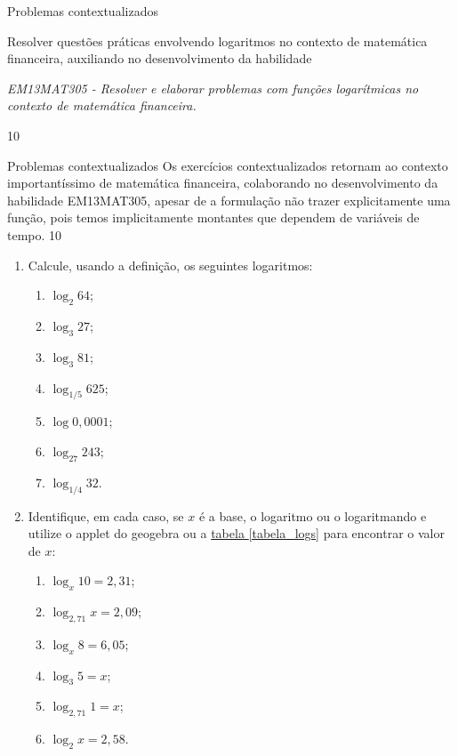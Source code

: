 \clearmargin
\begin{objectives}{Problemas contextualizados}
{
	Resolver questões práticas envolvendo logaritmos no contexto de matemática financeira, auxiliando no desenvolvimento da habilidade

	\textit{EM13MAT305 - Resolver e elaborar problemas com funções logarítmicas no contexto de matemática financeira.}
}{1}{0}
\end{objectives}
\begin{sugestions}{Problemas contextualizados}
{
	Os exercícios contextualizados retornam ao contexto importantíssimo de matemática financeira, colaborando no desenvolvimento da habilidade EM13MAT305, apesar de a formulação não trazer explicitamente uma função, pois temos implicitamente montantes que dependem de variáveis de tempo.
}{1}{0}
\end{sugestions}
\begin{enumerate}

\item {}\label{calcule}

Calcule, usando a definição, os seguintes logaritmos:
\begin{enumerate}
\item $\log_2 64$;
\item $\log_3 27$;
\item $\log_3 81$;
\item $\log_{1/5} 625$;
\item $\log 0,0001$;
\item $\log_{27} 243$;
\item $\log_{1/4} 32$.
\end{enumerate}

\needspace{.15\textheight}
\item{}\label{identifique}

Identifique, em cada caso, se $x$ é a base, o logaritmo  ou o logaritmando e utilize o applet do geogebra ou a \hyperref[tabela_logs]{tabela \ref{tabela_logs}} para encontrar o valor de $x$:
\begin{enumerate}
\item $\log_{x} 10 = 2{,}31$;
\item $\log_{2{,}71} x = 2{,}09$;
\item $\log_x 8 = 6{,}05$;
\item $\log_3 5 =x$;
\item $\log_{2{,}71} 1= x$;
\item $\log_{2} x= 2{,}58$.
\end{enumerate}
\end{enumerate} 


